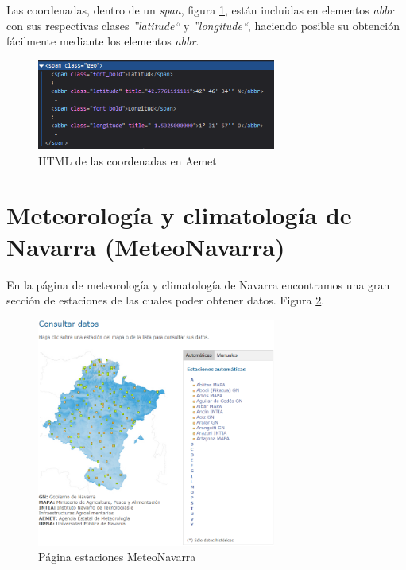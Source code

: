 Las coordenadas, dentro de un \textit{span}, figura \ref{fig:ej21}, están incluidas en elementos \textit{abbr} con sus respectivas clases \textit{''latitude``} y \textit{''longitude``}, haciendo posible su obtención fácilmente mediante los elementos \textit{abbr}.

\begin{figure} [H]
	\centering
	\includegraphics[width=0.7\textwidth]{fig/AemetCoordHTML.png}
	\caption[HTML de las coordenadas de Aemet de la estación en Aranguren (Navarra)]{HTML de las coordenadas en Aemet}
	\label{fig:ej21}
\end{figure}

\section{Meteorología y climatología de Navarra (MeteoNavarra)}
En la página de meteorología y climatología de Navarra encontramos una gran sección de estaciones de las cuales poder obtener datos. Figura \ref{fig:ej27}.

\begin{figure} [H]
	\centering
	\includegraphics[width=0.7\textwidth]{fig/MeteoNavarraCode.png}
	\caption[Página estaciones MeteoNavarra]{Página estaciones MeteoNavarra}
	\label{fig:ej27}
\end{figure}

